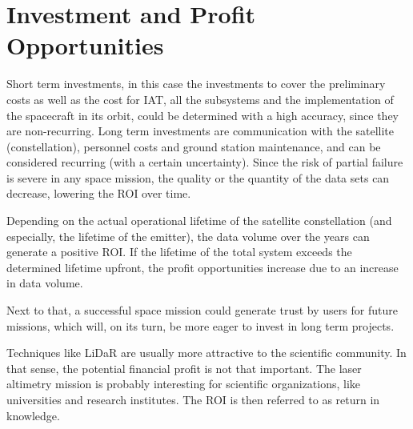 \section{Investment and Profit Opportunities}
	\label{blMAipo}
Short term investments, in this case the investments to cover the preliminary costs as well as the cost for \acs{IAT}, all the subsystems and the implementation of the spacecraft in its orbit, could be determined with a high accuracy, since they are non-recurring. Long term investments are communication with the satellite (constellation), personnel costs and ground station maintenance, and can be considered recurring (with a certain uncertainty). Since the risk of partial failure is severe in any space mission, the quality or the quantity of the data sets can decrease, lowering the \acs{ROI} over time. 

Depending on the actual operational lifetime of the satellite constellation (and especially, the lifetime of the emitter), the data volume over the years can generate a positive \acs{ROI}. If the lifetime of the total system exceeds the determined lifetime upfront, the profit opportunities increase due to an increase in data volume. 

Next to that, a successful space mission could generate trust by users for future missions, which will, on its turn, be more eager to invest in long term projects.

Techniques like \acs{LiDaR} are usually more attractive to the scientific community. In that sense, the potential financial profit is not that important. The \acs{laser} altimetry mission is probably interesting for scientific organizations, like universities and research institutes. The \acs{ROI} is then referred to as return in knowledge.  